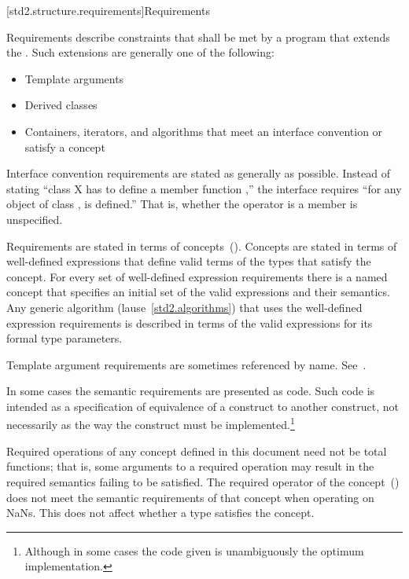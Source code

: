 [std2.structure.requirements]{Requirements}

\pnum
{}%
Requirements describe constraints that shall be met by a \Cpp program that
extends the .
Such extensions are generally one of the following:

\begin{itemize}
\item Template arguments
\item Derived classes
\item Containers, iterators, and algorithms that meet an interface convention
or satisfy a concept
\end{itemize}

\pnum
Interface convention requirements are stated as generally as possible. Instead
of stating ``class X has to define a member function ,'' the
interface requires ``for any object  of class ,  is
defined.'' That is, whether the operator is a member is unspecified.

\pnum
Requirements are stated in terms of concepts~().
Concepts are stated in terms of well-defined expressions that define valid terms of
the types that satisfy the concept. For every set of
well-defined expression requirements there is a named concept that
specifies an initial set of the valid expressions and their semantics. Any generic
algorithm (lause~\ref{std2.algorithms}) that uses the well-defined expression requirements
is described in terms of the valid expressions for its formal type parameters.

\pnum
Template argument requirements are sometimes referenced by name.
See~.

\pnum
In some cases the semantic requirements are presented as \Cpp code.
Such code is intended as a
specification of equivalence of a construct to another construct, not
necessarily as the way the construct
must be implemented.\footnote{Although in some cases the code given is
unambiguously the optimum implementation.}

\pnum
Required operations of any concept defined in this document need not be
total functions; that is, some arguments to a required operation may
result in the required semantics failing to be satisfied. \enterexample
The required \tcode{<} operator of the 
concept~() does not meet the
semantic requirements of that concept when operating on NaNs.\exitexample
This does not affect whether a type satisfies the concept.

